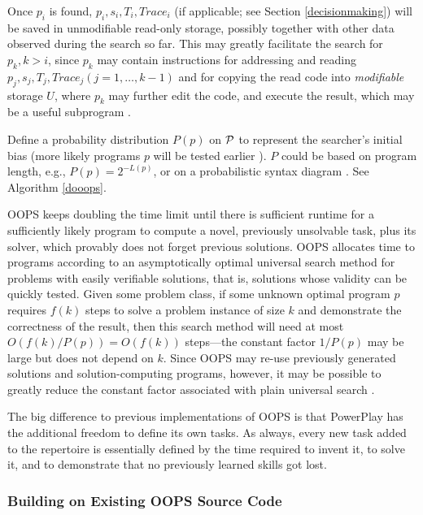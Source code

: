 \documentclass{article}
\begin{document}
Once $p_i$ is found, $p_i, s_i, T_i, Trace_i$ (if applicable; see Section \ref{decisionmaking}) 
will be saved in unmodifiable read-only storage,
possibly together with other data observed during the search so far. This
may greatly facilitate the search for  $p_k, k>i$, since
$p_k$ may contain instructions for addressing and reading $p_j, s_j, T_j, Trace_j (j=1, \ldots,k-1)$  and for copying the read code
into {\em modifiable} storage $U$, where $p_k$ may further edit the code, and execute the result, which may be a useful subprogram \cite{Schmidhuber:04oops}.

Define a probability distribution $P(p)$ on $\cal P$  to represent the searcher's 
initial bias (more likely programs $p$ will be tested earlier \cite{Levin:73}). $P$ could be based on program length, e.g., 
$P(p)=2^{-L(p)}$, or on a 
probabilistic syntax diagram \cite{Schmidhuber:04oops,Schmidhuber:04oopscode}.
See Algorithm \ref{dooops}.







OOPS keeps doubling the time limit until there is sufficient runtime for a sufficiently likely program 
to compute a novel, previously unsolvable task, plus its solver, which provably does not forget previous solutions.
OOPS  allocates time to programs according to 
an asymptotically optimal universal search method \cite{Levin:73}  for
problems with easily verifiable solutions, that is, solutions
whose validity can be quickly tested.
Given some problem class,
if some unknown optimal program $p$ requires $f(k)$ steps to solve a
problem instance of size $k$ and demonstrate the correctness of the result,
then this search method
will need at most $O(f(k) / P(p)) = O(f(k))$ steps---the constant 
factor  $1/P(p)$ may be large but does not depend on $k$.
Since OOPS may re-use previously generated solutions
and solution-computing programs, however, it may be possible to greatly 
reduce the constant factor  associated with plain universal search
\cite{Schmidhuber:04oops}.

The big difference to previous implementations of OOPS is that 
{\sc PowerPlay} has the additional freedom to define its own tasks. 
As always, every new task added to the repertoire is essentially defined by the time required 
to invent it, to solve it, and to demonstrate that no previously learned skills got lost.

\subsubsection{Building on Existing OOPS Source Code }
\label{forth}
\end{document}
